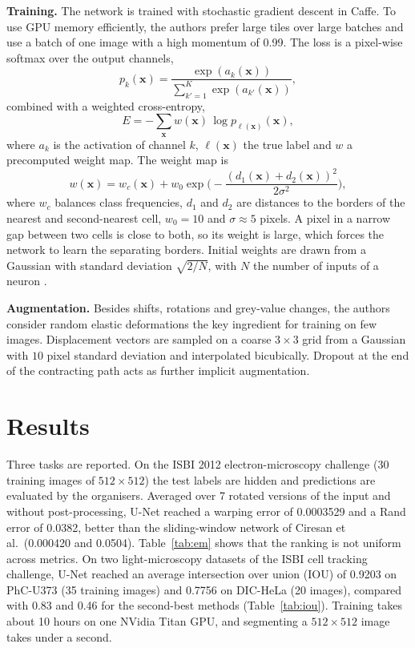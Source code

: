 \documentclass{article}
\begin{document}
\textbf{Training.} The network is trained with stochastic gradient descent in Caffe. To use GPU memory efficiently, the authors prefer large tiles over large batches and use a batch of one image with a high momentum of 0.99. The loss is a pixel-wise softmax over the output channels,
\begin{equation}
p_k(\mathbf{x}) = \frac{\exp(a_k(\mathbf{x}))}{\sum_{k'=1}^{K}\exp(a_{k'}(\mathbf{x}))},
\end{equation}
combined with a weighted cross-entropy,
\begin{equation}
E = -\sum_{\mathbf{x}} w(\mathbf{x})\,\log p_{\ell(\mathbf{x})}(\mathbf{x}),
\end{equation}
where $a_k$ is the activation of channel $k$, $\ell(\mathbf{x})$ the true label and $w$ a precomputed weight map. The weight map is
\begin{equation}
w(\mathbf{x}) = w_c(\mathbf{x}) + w_0\exp\!\Big(-\frac{(d_1(\mathbf{x})+d_2(\mathbf{x}))^2}{2\sigma^2}\Big),
\end{equation}
where $w_c$ balances class frequencies, $d_1$ and $d_2$ are distances to the borders of the nearest and second-nearest cell, $w_0=10$ and $\sigma\approx5$ pixels. A pixel in a narrow gap between two cells is close to both, so its weight is large, which forces the network to learn the separating borders. Initial weights are drawn from a Gaussian with standard deviation $\sqrt{2/N}$, with $N$ the number of inputs of a neuron \cite{he}.

\textbf{Augmentation.} Besides shifts, rotations and grey-value changes, the authors consider random elastic deformations the key ingredient for training on few images. Displacement vectors are sampled on a coarse $3\times3$ grid from a Gaussian with $10$ pixel standard deviation and interpolated bicubically. Dropout at the end of the contracting path acts as further implicit augmentation.

\section{Results}
Three tasks are reported. On the ISBI 2012 electron-microscopy challenge (30 training images of $512\times512$) the test labels are hidden and predictions are evaluated by the organisers. Averaged over 7 rotated versions of the input and without post-processing, U-Net reached a warping error of 0.0003529 and a Rand error of 0.0382, better than the sliding-window network of Ciresan et al.\ (0.000420 and 0.0504). Table~\ref{tab:em} shows that the ranking is not uniform across metrics. On two light-microscopy datasets of the ISBI cell tracking challenge, U-Net reached an average intersection over union (IOU) of 0.9203 on PhC-U373 (35 training images) and 0.7756 on DIC-HeLa (20 images), compared with 0.83 and 0.46 for the second-best methods (Table~\ref{tab:iou}). Training takes about 10 hours on one NVidia Titan GPU, and segmenting a $512\times512$ image takes under a second.
\end{document}
